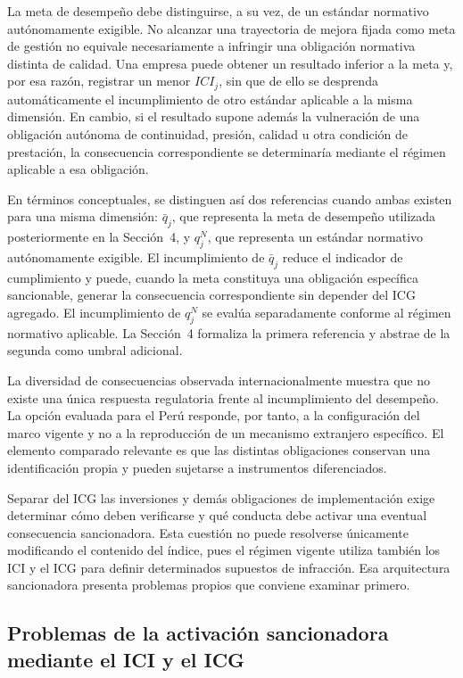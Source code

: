 La meta de desempeño debe distinguirse, a su vez, de un estándar normativo autónomamente exigible. No alcanzar una trayectoria de mejora fijada como meta de gestión no equivale necesariamente a infringir una obligación normativa distinta de calidad. Una empresa puede obtener un resultado inferior a la meta y, por esa razón, registrar un menor \(ICI_j\), sin que de ello se desprenda automáticamente el incumplimiento de otro estándar aplicable a la misma dimensión. En cambio, si el resultado supone además la vulneración de una obligación autónoma de continuidad, presión, calidad u otra condición de prestación, la consecuencia correspondiente se determinaría mediante el régimen aplicable a esa obligación.

En términos conceptuales, se distinguen así dos referencias cuando ambas existen para una misma dimensión: \(\bar q_j\), que representa la meta de desempeño utilizada posteriormente en la Sección~4, y \(q_j^{N}\), que representa un estándar normativo autónomamente exigible. El incumplimiento de \(\bar q_j\) reduce el indicador de cumplimiento y puede, cuando la meta constituya una obligación específica sancionable, generar la consecuencia correspondiente sin depender del ICG agregado. El incumplimiento de \(q_j^{N}\) se evalúa separadamente conforme al régimen normativo aplicable. La Sección~4 formaliza la primera referencia y abstrae de la segunda como umbral adicional.

La diversidad de consecuencias observada internacionalmente muestra que no existe una única respuesta regulatoria frente al incumplimiento del desempeño. La opción evaluada para el Perú responde, por tanto, a la configuración del marco vigente y no a la reproducción de un mecanismo extranjero específico. El elemento comparado relevante es que las distintas obligaciones conservan una identificación propia y pueden sujetarse a instrumentos diferenciados.

Separar del ICG las inversiones y demás obligaciones de implementación exige determinar cómo deben verificarse y qué conducta debe activar una eventual consecuencia sancionadora. Esta cuestión no puede resolverse únicamente modificando el contenido del índice, pues el régimen vigente utiliza también los ICI y el ICG para definir determinados supuestos de infracción. Esa arquitectura sancionadora presenta problemas propios que conviene examinar primero.

\subsection{Problemas de la activación sancionadora mediante el ICI y el ICG}

